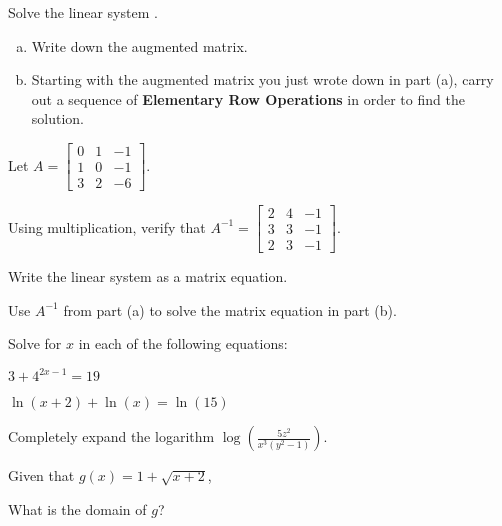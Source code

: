 \documentclass[12pt,legalpaper]{exam}
\newcommand{\MATRIX}[2]{\ensuremath{\left[\begin{array}{#1}#2\end{array}\right]}}
\newcommand{\ds}{\displaystyle}
\begin{document}
\begin{questions}
\question[6] Solve the linear system .
\begin{enumerate}[(a)]
\item Write down the augmented matrix.
\vspace{4cm}

\item Starting with the augmented matrix you just wrote down in part (a), carry out a sequence of \textbf{Elementary Row Operations} in order to find the solution.
\end{enumerate}
\newpage

\question[6] Let $A = \MATRIX{rrr}{0 & 1 & -1\\1 & 0 & -1\\3 & 2 & -6}$.
\begin{compactenum}[(a)]
\item Using multiplication, verify that $A^{-1} = \MATRIX{rrr}{2 & 4 & -1\\3 & 3 & -1\\2 & 3 & -1}$.
\vspace{8cm}

\item Write the linear system
 as a matrix equation.
\vspace{6cm}

\item Use $A^{-1}$ from part (a) to solve the matrix equation in part (b).
\end{compactenum}
\newpage

\question[4] Solve for $x$ in each of the following equations:
\begin{compactenum}[(a)]
\item $3 + 4^{2x - 1} = 19$
\vspace{8cm}

\item $\ln(x+2) + \ln(x) = \ln(15)$
\vspace{8cm}
\end{compactenum}

\question[3] Completely expand the logarithm $\ds{\log\left(\frac{5z^2}{x^3(y^2 - 1)}\right)}$.
\newpage

\question[3] Given that $g(x) = 1 + \sqrt{x+2}$,
\begin{compactenum}[(a)]
\item What is the domain of $g$?
\vspace{5cm}


\end{compactenum}
\end{questions}
\end{document}
